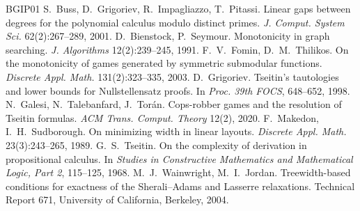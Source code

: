 \documentclass[11pt]{article}
\theoremstyle{definition}
\theoremstyle{remark}
\begin{document}
\begin{thebibliography}{BGIP01}
 S.~Buss, D.~Grigoriev, R.~Impagliazzo, T.~Pitassi.
Linear gaps between degrees for the polynomial calculus modulo distinct primes.
\emph{J. Comput. System Sci.} 62(2):267--289, 2001.
 D.~Bienstock, P.~Seymour. Monotonicity in graph searching.
\emph{J. Algorithms} 12(2):239--245, 1991.
 F.~V.~Fomin, D.~M.~Thilikos. On the monotonicity of games
generated by symmetric submodular functions. \emph{Discrete Appl. Math.}
131(2):323--335, 2003.
 D.~Grigoriev. Tseitin's tautologies and lower bounds for
Nullstellensatz proofs. In \emph{Proc. 39th FOCS}, 648--652, 1998.
 N.~Galesi, N.~Talebanfard, J.~Tor\'an. Cops-robber games
and the resolution of Tseitin formulas. \emph{ACM Trans. Comput. Theory}
12(2), 2020.
 F.~Makedon, I.~H.~Sudborough. On minimizing width in
linear layouts. \emph{Discrete Appl. Math.} 23(3):243--265, 1989.
 G.~S.~Tseitin. On the complexity of derivation in
propositional calculus. In \emph{Studies in Constructive Mathematics and
Mathematical Logic, Part 2}, 115--125, 1968.
 M.~J.~Wainwright, M.~I.~Jordan. Treewidth-based conditions
for exactness of the Sherali--Adams and Lasserre relaxations. Technical Report
671, University of California, Berkeley, 2004.
\end{thebibliography}
\end{document}
